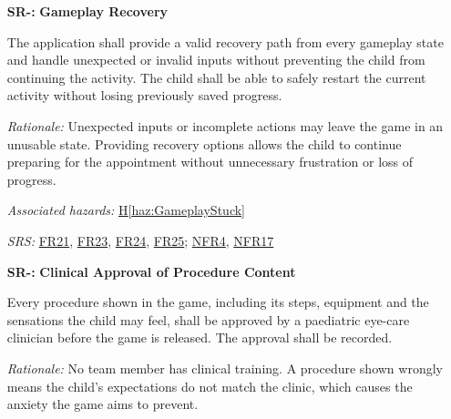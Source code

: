 \documentclass{article}
\newcounter{hazard}
\newcommand{\hazref}[1]{\hyperref[haz:#1]{H\ref*{haz:#1}}}
\newcounter{sr}
\newcommand{\srdef}[1]{\refstepcounter{sr}\label{sr:#1}\textbf{SR-\thesr:}}
\newcommand{\srsurl}{https://team-hindsight.github.io/ophthamology-game/SRS/SRS.pdf}
\newcommand{\srsfrref}[2]{\href{\srsurl\#nameddest=#1}{FR#2}}
\newcommand{\srsnfrref}[2]{\href{\srsurl\#nameddest=#1}{NFR#2}}
\begin{document}
\begin{itemize}[leftmargin=1.5cm, labelwidth=1.3cm, labelsep=0.2cm,
  align=left, itemsep=1.2em, parsep=0.6em]
The game shall prevent repeated touch inputs from
triggering multiple navigation actions during a
single screen transition. Essential procedure
information shall not be skipped as a result
of repeated or accidental touch inputs.

\textit{Rationale:}
Young children may repeatedly tap the screen
while interacting with the game. If multiple
inputs are processed unintentionally, the child
may skip important explanations about an
ophthalmology procedure. Preventing accidental
navigation helps ensure children receive the
necessary preparation information.

\textit{Associated hazards:}
\hazref{AccidentalInputSkipping}

\textit{SRS:} \srsfrref{FR_IgnoreRepeatedTouches}{19}; \srsnfrref{NFR_Responsiveness}{12}

\item[\srdef{GameplayRecovery}]
\textbf{Gameplay Recovery}

The application shall provide a valid recovery path from every
gameplay state and handle unexpected or invalid inputs without
preventing the child from continuing the activity. The child
shall be able to safely restart the current activity without
losing previously saved progress.

\textit{Rationale:}
Unexpected inputs or incomplete actions may leave the game
in an unusable state. Providing recovery options allows the
child to continue preparing for the appointment without
unnecessary frustration or loss of progress.

\textit{Associated hazards:}
\hazref{GameplayStuck}

\textit{SRS:} \srsfrref{FR_ExitLevel}{21}, \srsfrref{FR_ExitKeepsData}{23}, \srsfrref{FR_RestartAfterExit}{24}, \srsfrref{FR_RestartLevel}{25}; \srsnfrref{NFR_Exit}{4}, \srsnfrref{NFR_Reliability}{17}

\item[\srdef{ClinicianApproval}] \textbf{Clinical Approval of Procedure Content}

Every procedure shown in the game, including its steps, equipment and the
sensations the child may feel, shall be approved by a paediatric eye-care
clinician before the game is released. The approval shall be recorded.

\textit{Rationale:} No team member has clinical training. A procedure shown
wrongly means the child's expectations do not match the clinic, which causes
the anxiety the game aims to prevent.


\end{itemize}
\end{document}
